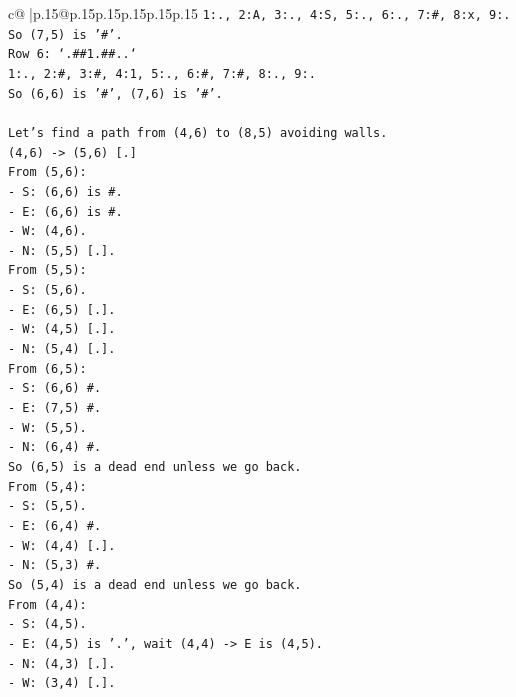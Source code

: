 \documentclass{article}
\begin{document}
{\begin{supertabular}{c@{$\;$}|p{.15\linewidth}@{}p{.15\linewidth}p{.15\linewidth}p{.15\linewidth}p{.15\linewidth}p{.15\linewidth}}
{{{\texttt{1:., 2:A, 3:., 4:S, 5:., 6:., 7:\#, 8:x, 9:.} \\
\texttt{So (7,5) is '\#'.} \\
\texttt{Row 6: `.\#\#1.\#\#..`} \\
\texttt{1:., 2:\#, 3:\#, 4:1, 5:., 6:\#, 7:\#, 8:., 9:.} \\
\texttt{So (6,6) is '\#', (7,6) is '\#'.} \\
\\ 
\texttt{Let's find a path from (4,6) to (8,5) avoiding walls.} \\
\texttt{(4,6) {-}> (5,6) {[}.{]}} \\
\texttt{From (5,6):} \\
\texttt{{-} S: (6,6) is \#.} \\
\texttt{{-} E: (6,6) is \#.} \\
\texttt{{-} W: (4,6).} \\
\texttt{{-} N: (5,5) {[}.{]}.} \\
\texttt{From (5,5):} \\
\texttt{{-} S: (5,6).} \\
\texttt{{-} E: (6,5) {[}.{]}.} \\
\texttt{{-} W: (4,5) {[}.{]}.} \\
\texttt{{-} N: (5,4) {[}.{]}.} \\
\texttt{From (6,5):} \\
\texttt{{-} S: (6,6) \#.} \\
\texttt{{-} E: (7,5) \#.} \\
\texttt{{-} W: (5,5).} \\
\texttt{{-} N: (6,4) \#.} \\
\texttt{So (6,5) is a dead end unless we go back.} \\
\texttt{From (5,4):} \\
\texttt{{-} S: (5,5).} \\
\texttt{{-} E: (6,4) \#.} \\
\texttt{{-} W: (4,4) {[}.{]}.} \\
\texttt{{-} N: (5,3) \#.} \\
\texttt{So (5,4) is a dead end unless we go back.} \\
\texttt{From (4,4):} \\
\texttt{{-} S: (4,5).} \\
\texttt{{-} E: (4,5) is '.', wait (4,4) {-}> E is (4,5).} \\
\texttt{{-} N: (4,3) {[}.{]}.} \\
\texttt{{-} W: (3,4) {[}.{]}.} \\
}}}
\end{supertabular}}
\end{document}
